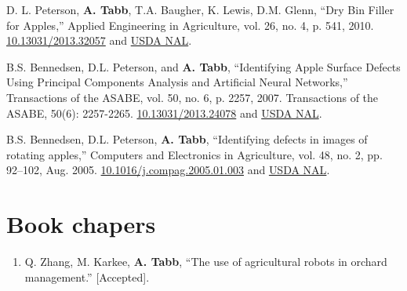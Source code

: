 \documentclass[letterpaper,11pt]{article}
\begin{document}
\begin{enumerate}[noitemsep, leftmargin=*,label={[\arabic*]}]
\item{D. L. Peterson, \textbf{A. Tabb}, T.A. Baugher, K. Lewis, D.M. Glenn, “Dry Bin Filler for Apples,” Applied Engineering in Agriculture, vol. 26, no. 4, p. 541, 2010. \href{https://doi.org/10.13031/2013.32057}{10.13031/2013.32057} and \href{https://naldc.nal.usda.gov/download/46081/PDF}{USDA NAL}.}

\item{B.S. Bennedsen, D.L. Peterson, and \textbf{A. Tabb}, “Identifying Apple Surface Defects Using Principal Components Analysis and Artificial Neural Networks,” Transactions of the ASABE, vol. 50, no. 6, p. 2257, 2007. Transactions of the ASABE, 50(6): 2257-2265. \href{https://doi.org/10.13031/2013.24078}{10.13031/2013.24078} and \href{https://naldc.nal.usda.gov/download/19567/PDF}{USDA NAL}.}

\item{B.S. Bennedsen, D.L. Peterson, \textbf{A. Tabb}, “Identifying defects in images of rotating apples,” Computers and Electronics in Agriculture, vol. 48, no. 2, pp. 92–102, Aug. 2005. \href{https://doi.org/10.1016/j.compag.2005.01.003}{10.1016/j.compag.2005.01.003} and \href{https://naldc.nal.usda.gov/download/6652/PDF}{USDA NAL}.}
\end{enumerate}

\section{Book chapers}
\begin{enumerate}[noitemsep, leftmargin=*,resume*]
\item{Q. Zhang, M. Karkee, \textbf{A. Tabb}, ``The use of agricultural robots in orchard management.” [Accepted].}
\end{enumerate}

\end{document}
